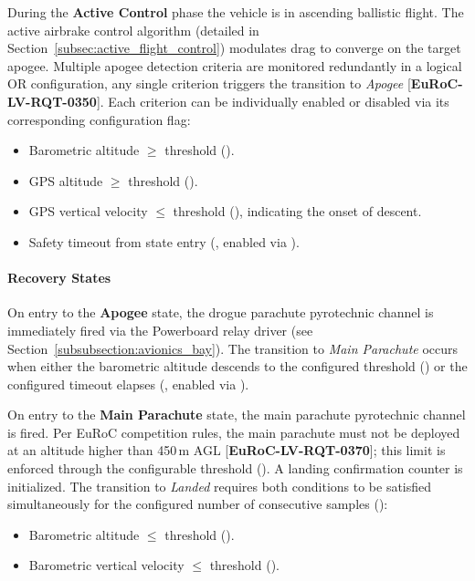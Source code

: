 \documentclass[11pt, a4paper]{article} %
\newcommand{\req}[1]{[\textcolor{EtseNavy}{\textbf{#1}}]}
\begin{document}
During the \textbf{Active Control} phase the vehicle is in ascending ballistic flight. The active airbrake control algorithm (detailed in Section~\ref{subsec:active_flight_control}) modulates drag to converge on the target apogee. Multiple apogee detection criteria are monitored redundantly in a logical OR configuration, any single criterion triggers the transition to \emph{Apogee} \req{EuRoC-LV-RQT-0350}. Each criterion can be individually enabled or disabled via its corresponding configuration flag:
\begin{itemize}
    \item Barometric altitude $\geq$ threshold ().
    \item GPS altitude $\geq$ threshold ().
    \item GPS vertical velocity $\leq$ threshold (), indicating the onset of descent.
    \item Safety timeout from state entry (, enabled via ).
\end{itemize}

\paragraph{Recovery States}

On entry to the \textbf{Apogee} state, the drogue parachute pyrotechnic channel is immediately fired via the Powerboard relay driver (see Section~\ref{subsubsection:avionics_bay}). The transition to \emph{Main Parachute} occurs when either the barometric altitude descends to the configured threshold () or the configured timeout elapses (, enabled via ).

On entry to the \textbf{Main Parachute} state, the main parachute pyrotechnic channel is fired. Per EuRoC competition rules, the main parachute must not be deployed at an altitude higher than 450\,m AGL \req{EuRoC-LV-RQT-0370}; this limit is enforced through the configurable threshold (). A landing confirmation counter is initialized. The transition to \emph{Landed} requires both conditions to be satisfied simultaneously for the configured number of consecutive samples ():
\begin{itemize}
    \item Barometric altitude $\leq$ threshold ().
    \item Barometric vertical velocity $\leq$ threshold ().
\end{itemize}
\end{document}
